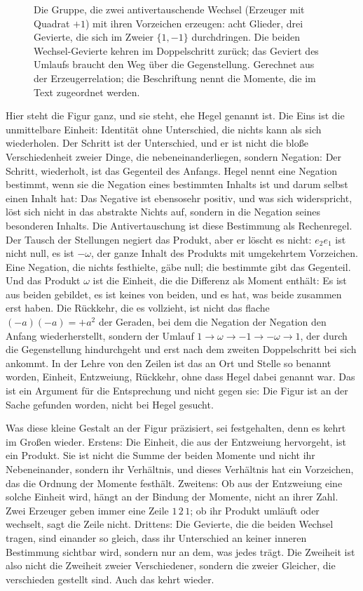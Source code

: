 \documentclass[11pt,a4paper]{article}
\newcommand{\Randlesart}{\marginpar{\raggedright\footnotesize\textcolor{lesart}{$\bigcirc$\,Lesart}}}
\begin{document}
\begin{figure}[h]
\centering

\caption[Das Geacht der Form]{Die Gruppe, die zwei antivertauschende Wechsel (Erzeuger mit Quadrat $+1$) mit ihren Vorzeichen erzeugen: acht Glieder, drei Gevierte, die sich im Zweier $\{1,-1\}$ durchdringen. Die beiden Wechsel-Gevierte kehren im Doppelschritt zurück; das Geviert des Umlaufs braucht den Weg über die Gegenstellung. Gerechnet aus der Erzeugerrelation; die Beschriftung nennt die Momente, die im Text zugeordnet werden.}
\label{fig:geacht}
\end{figure}

\Randlesart Hier steht die Figur ganz, und sie steht, ehe Hegel genannt ist. Die Eins ist die unmittelbare Einheit: Identität ohne Unterschied, die nichts kann als sich wiederholen. Der Schritt ist der Unterschied, und er ist nicht die bloße Verschiedenheit zweier Dinge, die nebeneinanderliegen, sondern Negation: Der Schritt, wiederholt, ist das Gegenteil des Anfangs. Hegel nennt eine Negation bestimmt, wenn sie die Negation eines bestimmten Inhalts ist und darum selbst einen Inhalt hat: Das Negative ist ebensosehr positiv, und was sich widerspricht, löst sich nicht in das abstrakte Nichts auf, sondern in die Negation seines besonderen Inhalts. Die Antivertauschung ist diese Bestimmung als Rechenregel. Der Tausch der Stellungen negiert das Produkt, aber er löscht es nicht: $e_2e_1$ ist nicht null, es ist $-\omega$, der ganze Inhalt des Produkts mit umgekehrtem Vorzeichen. Eine Negation, die nichts festhielte, gäbe null; die bestimmte gibt das Gegenteil. Und das Produkt $\omega$ ist die Einheit, die die Differenz als Moment enthält: Es ist aus beiden gebildet, es ist keines von beiden, und es hat, was beide zusammen erst haben. Die Rückkehr, die es vollzieht, ist nicht das flache $(-a)(-a)=+a^2$ der Geraden, bei dem die Negation der Negation den Anfang wiederherstellt, sondern der Umlauf $1\to\omega\to-1\to-\omega\to1$, der durch die Gegenstellung hindurchgeht und erst nach dem zweiten Doppelschritt bei sich ankommt. In der Lehre von den Zeilen ist das an Ort und Stelle so benannt worden, Einheit, Entzweiung, Rückkehr, ohne dass Hegel dabei genannt war. Das ist ein Argument für die Entsprechung und nicht gegen sie: Die Figur ist an der Sache gefunden worden, nicht bei Hegel gesucht.

Was diese kleine Gestalt an der Figur präzisiert, sei festgehalten, denn es kehrt im Großen wieder. Erstens: Die Einheit, die aus der Entzweiung hervorgeht, ist ein Produkt. Sie ist nicht die Summe der beiden Momente und nicht ihr Nebeneinander, sondern ihr Verhältnis, und dieses Verhältnis hat ein Vorzeichen, das die Ordnung der Momente festhält. Zweitens: Ob aus der Entzweiung eine solche Einheit wird, hängt an der Bindung der Momente, nicht an ihrer Zahl. Zwei Erzeuger geben immer eine Zeile $1\,2\,1$; ob ihr Produkt umläuft oder wechselt, sagt die Zeile nicht. Drittens: Die Gevierte, die die beiden Wechsel tragen, sind einander so gleich, dass ihr Unterschied an keiner inneren Bestimmung sichtbar wird, sondern nur an dem, was jedes trägt. Die Zweiheit ist also nicht die Zweiheit zweier Verschiedener, sondern die zweier Gleicher, die verschieden gestellt sind. Auch das kehrt wieder.
\end{document}
